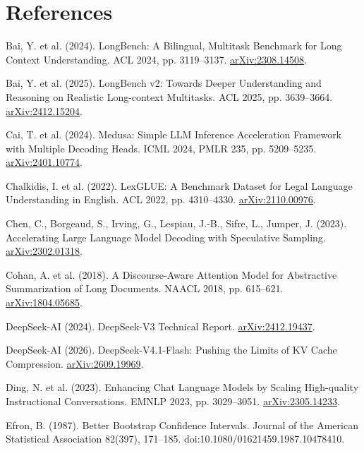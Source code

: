 \documentclass[11pt]{article}
\begin{document}
\section*{References}
\begin{list}{}{\setlength{\leftmargin}{1.5em}\setlength{\itemindent}{-1.5em}\setlength{\itemsep}{1pt}\setlength{\parsep}{0pt}}\small\raggedright
\item Bai, Y. et al. (2024). LongBench: A Bilingual, Multitask Benchmark for Long Context Understanding. ACL 2024, pp. 3119--3137. \href{https://arxiv.org/abs/2308.14508}{arXiv:2308.14508}.
\item Bai, Y. et al. (2025). LongBench v2: Towards Deeper Understanding and Reasoning on Realistic Long-context Multitasks. ACL 2025, pp. 3639--3664. \href{https://arxiv.org/abs/2412.15204}{arXiv:2412.15204}.
\item Cai, T. et al. (2024). Medusa: Simple LLM Inference Acceleration Framework with Multiple Decoding Heads. ICML 2024, PMLR 235, pp. 5209--5235. \href{https://arxiv.org/abs/2401.10774}{arXiv:2401.10774}.
\item Chalkidis, I. et al. (2022). LexGLUE: A Benchmark Dataset for Legal Language Understanding in English. ACL 2022, pp. 4310--4330. \href{https://arxiv.org/abs/2110.00976}{arXiv:2110.00976}.
\item Chen, C., Borgeaud, S., Irving, G., Lespiau, J.-B., Sifre, L., Jumper, J. (2023). Accelerating Large Language Model Decoding with Speculative Sampling. \href{https://arxiv.org/abs/2302.01318}{arXiv:2302.01318}.
\item Cohan, A. et al. (2018). A Discourse-Aware Attention Model for Abstractive Summarization of Long Documents. NAACL 2018, pp. 615--621. \href{https://arxiv.org/abs/1804.05685}{arXiv:1804.05685}.
\item DeepSeek-AI (2024). DeepSeek-V3 Technical Report. \href{https://arxiv.org/abs/2412.19437}{arXiv:2412.19437}.
\item DeepSeek-AI (2026). DeepSeek-V4.1-Flash: Pushing the Limits of KV Cache Compression. \href{https://arxiv.org/abs/2609.19969}{arXiv:2609.19969}.
\item Ding, N. et al. (2023). Enhancing Chat Language Models by Scaling High-quality Instructional Conversations. EMNLP 2023, pp. 3029--3051. \href{https://arxiv.org/abs/2305.14233}{arXiv:2305.14233}.
\item Efron, B. (1987). Better Bootstrap Confidence Intervals. Journal of the American Statistical Association 82(397), 171--185. doi:10.1080/01621459.1987.10478410.

\end{list}
\end{document}
